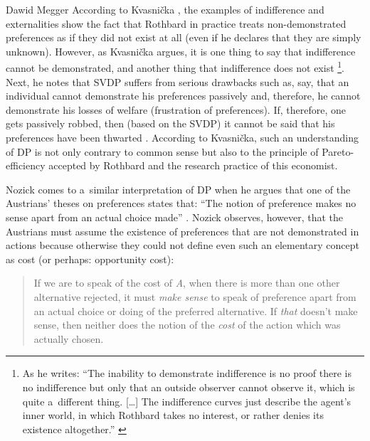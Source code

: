 \begin{artengenv}{Dawid Megger}
According to Kvasnička 
\parencite*[][]{kvasnicka_rothbards_2008}, %
 the examples of indifference and externalities show the fact that Rothbard in practice treats non-demonstrated preferences as if they did not exist at all (even if he declares that they are simply unknown). However, as Kvasnička argues, it is one thing to say that indifference cannot be demonstrated, and another thing that indifference does not exist 
\parencite[][p.44]{kvasnicka_rothbards_2008}%
\footnote{As he writes: ``The inability to demonstrate indifference is no proof there is no indifference but only that an outside observer cannot observe it, which is quite a~different thing. […] The indifference curves just describe the agent's inner world, in which Rothbard takes no interest, or rather denies its existence altogether.'' 
\parencite[][p.44]{kvasnicka_rothbards_2008}%
}. Next, he notes that SVDP suffers from serious drawbacks such as, say, that an individual cannot demonstrate his preferences passively and, therefore, he cannot demonstrate his losses of welfare (frustration of preferences). If, therefore, one gets passively robbed, then (based on the SVDP) it cannot be said that his preferences have been thwarted 
\parencite[][pp.45–46]{kvasnicka_rothbards_2008}. %
 According to Kvasnička, such an understanding of DP is not only contrary to common sense but also to the principle of Pareto-efficiency accepted by Rothbard and the research practice of this economist.



Nozick comes to a~similar interpretation of DP when he argues that one of the Austrians' theses on preferences states that: ``The notion of preference makes no sense apart from an actual choice made'' 
\parencite[][p.370]{nozick_austrian_1977}. %
 Nozick observes, however, that the Austrians must assume the existence of preferences that are not demonstrated in actions because otherwise they could not define even such an elementary concept as cost (or perhaps: opportunity cost):



\begin{quote}
If we are to speak of the cost of \textit{A}, when there is more than one other alternative rejected, it must \textit{make sense} to speak of preference apart from an actual choice or doing of the preferred alternative. If \textit{that} doesn't make sense, then neither does the notion of the \textit{cost} of the action which was actually chosen. 
\parencite[][p.373]{nozick_austrian_1977}%
\end{quote}





\end{artengenv}
